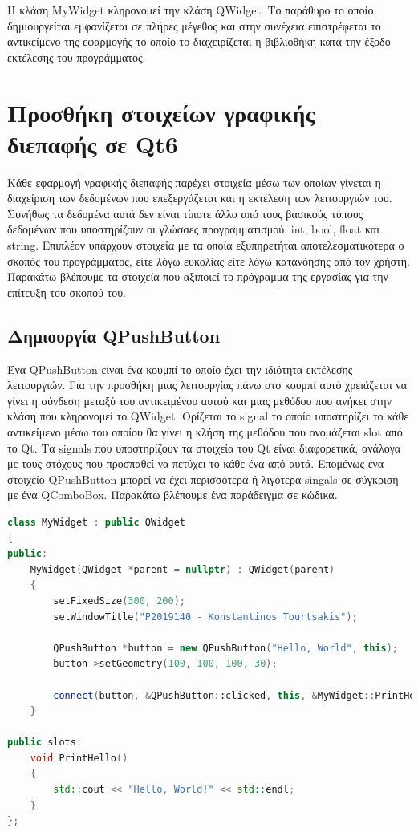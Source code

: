 Η κλάση MyWidget κληρονομεί την κλάση QWidget. Το παράθυρο το οποίο δημιουργείται
εμφανίζεται σε πλήρες μέγεθος και στην συνέχεια επιστρέφεται το αντικείμενο της εφαρμογής
το οποίο το διαχειρίζεται η βιβλιοθήκη κατά την έξοδο εκτέλεσης του προγράμματος.


\section{Προσθήκη στοιχείων γραφικής διεπαφής σε Qt6}
Κάθε εφαρμογή γραφικής διεπαφής παρέχει στοιχεία μέσω των οποίων γίνεται η διαχείριση
των δεδομένων που επεξεργάζεται και η εκτέλεση των λειτουργιών του. Συνήθως τα δεδομένα αυτά δεν είναι τίποτε άλλο από
τους βασικούς τύπους δεδομένων που υποστηρίζουν οι γλώσσες προγραμματισμού:
int, bool, float και string. Επιπλέον υπάρχουν στοιχεία με τα οποία εξυπηρετήται
αποτελεσματικότερα ο σκοπός του προγράμματος, είτε λόγω ευκολίας είτε λόγω κατανόησης
από τον χρήστη. Παρακάτω βλέπουμε τα στοιχεία που αξιποιεί το πρόγραμμα της
εργασίας για την επίτευξη του σκοπού του.

\subsection{Δημιουργία QPushButton}
Ένα QPushButton είναι ένα κουμπί το οποίο έχει την ιδιότητα εκτέλεσης λειτουργιών.
Για την προσθήκη μιας λειτουργίας πάνω στο κουμπί αυτό χρειάζεται να γίνει η
σύνδεση μεταξύ του αντικειμένου αυτού και μιας μεθόδου που ανήκει στην κλάση που
κληρονομεί το QWidget. Ορίζεται το signal το οποίο υποστηρίζει το κάθε αντικείμενο
μέσω του οποίου θα γίνει η κλήση της μεθόδου που ονομάζεται slot από το Qt.
Τα signals που υποστηρίζουν τα στοιχεία του Qt είναι διαφορετικά, ανάλογα με τους
στόχους που προσπαθεί να πετύχει το κάθε ένα από αυτά. Επομένως ένα στοιχείο QPushButton
μπορεί να έχει περισσότερα ή λιγότερα singals σε σύγκριση με ένα QComboBox.
Παρακάτω βλέπουμε ένα παράδειγμα σε κώδικα.
\begin{lstlisting}[language=C++, style=cppstyle]
class MyWidget : public QWidget 
{
public:
    MyWidget(QWidget *parent = nullptr) : QWidget(parent) 
    {
        setFixedSize(300, 200);
        setWindowTitle("P2019140 - Konstantinos Tourtsakis");

        QPushButton *button = new QPushButton("Hello, World", this);
        button->setGeometry(100, 100, 100, 30);

        connect(button, &QPushButton::clicked, this, &MyWidget::PrintHello);
    }

public slots:
    void PrintHello() 
    {
        std::cout << "Hello, World!" << std::endl;
    }
};
\end{lstlisting}

